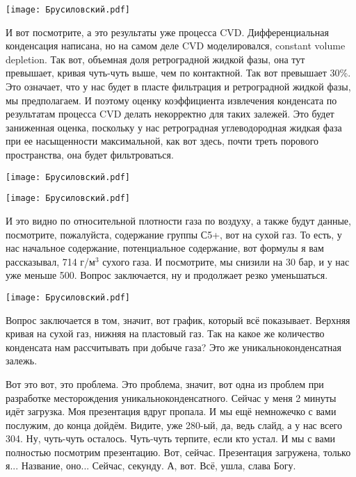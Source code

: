 \documentclass[main.tex]{subfiles}
\begin{document}
\begin{center}
\texttt{[image: Брусиловский.pdf]}
\end{center}

И вот посмотрите, а это результаты уже процесса CVD.
Дифференциальная конденсация написана, но на самом деле CVD моделировался, constant volume depletion.
Так вот, объемная доля ретроградной жидкой фазы, она тут превышает, кривая чуть-чуть выше, чем по контактной.
Так вот превышает 30\%.
Это означает, что у нас будет в пласте фильтрация и ретроградной жидкой фазы, мы предполагаем.
И поэтому оценку коэффициента извлечения конденсата по результатам процесса CVD делать некорректно для таких залежей.
Это будет заниженная оценка, поскольку у нас ретроградная углеводородная жидкая фаза при ее насыщенности максимальной, как вот здесь, почти треть порового пространства, она будет фильтроваться.

\begin{center}
\texttt{[image: Брусиловский.pdf]}
\end{center}



\begin{center}
\texttt{[image: Брусиловский.pdf]}
\end{center}

И это видно по относительной плотности газа по воздуху, а также будут данные, посмотрите, пожалуйста, содержание группы С5+, вот на сухой газ.
То есть, у нас начальное содержание, потенциальное содержание, вот формулы я вам рассказывал, 714 г/м$^3$ сухого газа.
И посмотрите, мы снизили на 30 бар, и у нас уже меньше 500.
Вопрос заключается, ну и продолжает резко уменьшаться.

\begin{center}
\texttt{[image: Брусиловский.pdf]}
\end{center}

Вопрос заключается в том, значит, вот график, который всё показывает.
Верхняя кривая на сухой газ, нижняя на пластовый газ.
Так на какое же количество конденсата нам рассчитывать при добыче газа?
Это же уникальноконденсатная залежь.

Вот это вот, это проблема.
Это проблема, значит, вот одна из проблем при разработке месторождения уникальноконденсатного.
Сейчас у меня 2 минуты идёт загрузка.
Моя презентация вдруг пропала.
И мы ещё немножечко с вами послужим, до конца дойдём.
Видите, уже 280-ый, да, ведь слайд, а у нас всего 304.
Ну, чуть-чуть осталось.
Чуть-чуть терпите, если кто устал.
И мы с вами полностью посмотрим презентацию.
Вот, сейчас.
Презентация загружена, только я...
Название, оно...
Сейчас, секунду.
А, вот.
Всё, ушла, слава Богу.
\end{document}
